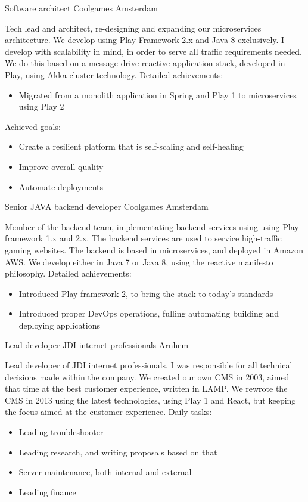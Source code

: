 \documentclass[11pt,a4paper]{moderncv}
\begin{document}
\vspace*{0.2\baselineskip}
{Software architect}
{Coolgames}
{Amsterdam}
{}
{
    Tech lead and architect, re-designing and expanding our microservices
    architecture. We develop using Play Framework 2.x and Java 8 exclusively.
    I develop with scalability in mind, in order to serve all traffic
    requirements needed. We do this based on a message drive reactive
    application stack, developed in Play, using Akka cluster technology.
    \newline{}%
    Detailed achievements:%
    \begin{itemize}
        \item Migrated from a monolith application in Spring and Play 1 to microservices using Play 2
    \end{itemize}
    Achieved goals:%
    \begin{itemize}
        \item Create a resilient platform that is self-scaling and self-healing
        \item Improve overall quality
        \item Automate deployments
    \end{itemize}
}

{Senior JAVA backend developer}
{Coolgames}
{Amsterdam}
{}
{
    Member of the backend team, implementating backend services using using Play framework 1.x and 2.x.
    The backend services are used to service high-traffic gaming websites. The backend is based 
    in microservices, and deployed in Amazon AWS.
    We develop either in Java 7 or Java 8, using the reactive manifesto philosophy.\newline{}%
    \newline{}%
    Detailed achievements:%
    \begin{itemize}
        \item Introduced Play framework 2, to bring the stack to today's standards
        \item Introduced proper DevOps operations, fulling automating building and deploying applications
    \end{itemize}
}

\vspace*{0.2\baselineskip}
{Lead developer}
{JDI internet professionals}
{Arnhem}
{}
{
    Lead developer of JDI internet professionals. I was responsible for all technical decisions made within the company.
    We created our own CMS in 2003, aimed that time at the best customer experience, written in LAMP.
    We rewrote the CMS in 2013 using the latest technologies, using Play 1 and React, but keeping the focus aimed at the customer experience.
    \newline{}%
    Daily tasks:%
    \begin{itemize}
        \item Leading troubleshooter
        \item Leading research, and writing proposals based on that
        \item Server maintenance, both internal and external
        \item Leading finance
    \end{itemize}
}
\end{document}
